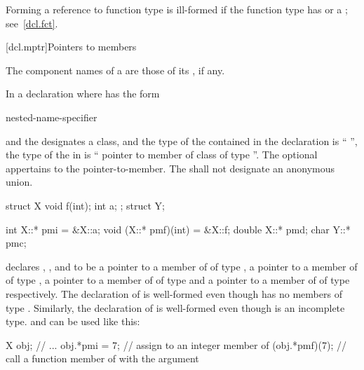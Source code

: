 \pnum
\begin{note}
Forming a reference to function type is ill-formed if the function
type has  or a ;
see~\ref{dcl.fct}.
\end{note}

[dcl.mptr]{Pointers to members}%
%
%

\pnum
{}%
The component names of a  are
those of its , if any.

\pnum
In a declaration
where
has the form
\begin{ncsimplebnf}
nested-name-specifier \terminal{*}   
\end{ncsimplebnf}
and the
designates a class,
and the type of the contained  in the declaration
is ``
'',
the type of the  in
is ``  pointer to member of class
 of type
''.
The optional  appertains to the
pointer-to-member.
The  shall not designate an anonymous union.

\pnum
\begin{example}
\begin{codeblock}
struct X {
  void f(int);
  int a;
};
struct Y;

int X::* pmi = &X::a;
void (X::* pmf)(int) = &X::f;
double X::* pmd;
char Y::* pmc;
\end{codeblock}
declares
,
,
and
to be a pointer to a member of
of type
,
a pointer to a member of
of type
,
a pointer to a member of
of type
and a pointer to a member of
of type
respectively.
The declaration of
is well-formed even though
has no members of type
.
Similarly, the declaration of
is well-formed even though
is an incomplete type.
and
can be used like this:
\begin{codeblock}
X obj;
// ...
obj.*pmi = 7;       // assign  to an integer member of 
(obj.*pmf)(7);      // call a function member of  with the argument 
\end{codeblock}
\end{example}

